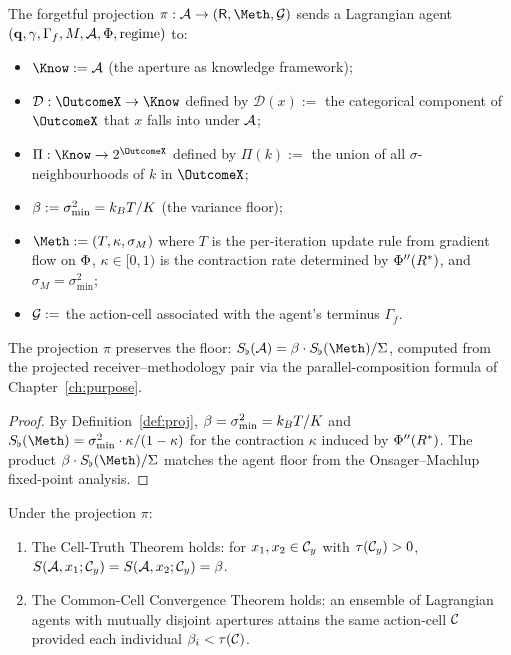 \begin{definition}\label{def:proj}
The forgetful projection $\pi:\agent\to(\receiver,\Meth,\Goal)$ sends a
Lagrangian agent $(\mathbf{q},\gamma,\Gamma_f,M,\mathcal{A},\Phi,\mathrm{regime})$
to:
\begin{itemize}[leftmargin=*]
\item $\Know:=\Aper$ (the aperture as knowledge framework);
\item $\mathcal{D}:\OutcomeX\to\Know$ defined by $\mathcal{D}(x):=$ the
  categorical component of $\OutcomeX$ that $x$ falls into under $\mathcal{A}$;
\item $\Pi:\Know\to 2^{\OutcomeX}$ defined by $\Pi(k):=$ the union of all
  $\sigma$-neighbourhoods of $k$ in $\OutcomeX$;
\item $\beta:=\sigma^2_{\min}=k_B T/K$ (the variance floor);
\item $\Meth:=(T,\kappa,\sigma_M)$ where $T$ is the per-iteration update
  rule from gradient flow on $\Phi$, $\kappa\in[0,1)$ is the contraction
  rate determined by $\Phi''(R^*)$, and $\sigma_M=\sigma^2_{\min}$;
\item $\mathcal{G}:=$ the action-cell associated with the agent's terminus
  $\Gamma_f$.
\end{itemize}
\end{definition}

\begin{theorem}\label{thm:proj-consist}
The projection $\pi$ preserves the floor: $\Sfloor(\agent)=\beta\cdot\Sfloor(\Meth)/\Sigma$,
computed from the projected receiver--methodology pair via the
parallel-composition formula of Chapter~\ref{ch:purpose}.
\end{theorem}

\begin{proof}
By Definition~\ref{def:proj}, $\beta=\sigma^2_{\min}=k_B T/K$ and
$\Sfloor(\Meth)=\sigma^2_{\min}\cdot\kappa/(1-\kappa)$ for the contraction
$\kappa$ induced by $\Phi''(R^*)$. The product $\beta\cdot\Sfloor(\Meth)/\Sigma$
matches the agent floor from the Onsager--Machlup fixed-point analysis.
\end{proof}

\begin{theorem}
\label{thm:ch04-cell-truth-rec}
Under the projection $\pi$:
\begin{enumerate}[label=(\arabic*),leftmargin=*]
\item The Cell-Truth Theorem holds: for $x_1,x_2\in\mathcal{C}_y$ with
  $\tau(\mathcal{C}_y)>0$, $S(\mathcal{A},x_1;\mathcal{C}_y)=S(\mathcal{A},x_2;\mathcal{C}_y)=\beta$.
\item The Common-Cell Convergence Theorem holds: an ensemble of Lagrangian
  agents with mutually disjoint apertures attains the same action-cell
  $\mathcal{C}$ provided each individual $\beta_i<\tau(\mathcal{C})$.
\end{enumerate}
\end{theorem}

